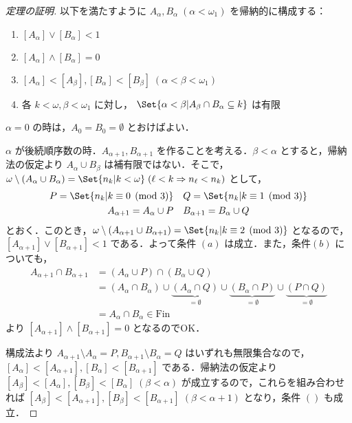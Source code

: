\documentclass[a4j,lualatex,ja=standard]{bxjsarticle}
\begin{document}
\begin{proof}[定理の証明]
 以下を満たすように $A_\alpha, B_\alpha \; (\alpha < \omega_1)$ を帰納的に構成する：
 \begin{enumerate}[label=(\alph*)]
  \item $[A_\alpha] \vee [B_\alpha] < 1$
  \item $[A_\alpha] \wedge [B_\alpha] = 0$
  \item $[A_\alpha] < [A_\beta], [B_\alpha] < [B_\beta]\;(\alpha < \beta < \omega_1)$
  \item 各 $k < \omega, \beta < \omega_1$ に対し，
	$\Set{\alpha < \beta | A_\beta \cap B_\alpha \subseteq k}$ は有限
 \end{enumerate}

 $\alpha = 0$ の時は，$A_0 = B_0 = \emptyset$ とおけばよい．

 $\alpha$ が後続順序数の時．$A_{\alpha + 1}, B_{\alpha + 1}$ を作ることを考える．$\beta < \alpha$ とすると，帰納法の仮定より $A_\alpha \cup B_\beta$ は補有限ではない．そこで，$\omega \setminus (A_\alpha \cup B_\alpha) = \Set{ n_k | k < \omega } \; (\ell < k \Rightarrow n_\ell < n_k)$ として，
 \begin{gather*}
  P = \Set{n_k | k \equiv 0 \pmod{3}} \quad Q = \Set{n_k | k \equiv 1 \pmod{3}}\\
  A_{\alpha + 1} = A_\alpha \cup P \quad B_{\alpha + 1} = B_\alpha \cup Q
 \end{gather*}
  とおく．このとき，$\omega \setminus (A_{\alpha + 1} \cup B_{\alpha + 1}) = \Set{n_k | k \equiv 2 \pmod{3}}$ となるので，$[A_{\alpha + 1}] \vee [B_{\alpha+1}] < 1$ である．よって条件 $(a)$ は成立．また，条件$(b)$ についても，
 \begin{align*}
  A_{\alpha + 1} \cap B_{\alpha+1} &= (A_\alpha \cup P) \cap (B_\alpha \cup Q)\\
  &= (A_\alpha \cap B_\alpha) \cup \underbrace{ (A_\alpha \cap Q)}_{=\emptyset} \cup \underbrace{(B_\alpha \cap P)}_{=\emptyset} \cup \underbrace{(P \cap Q)}_{=\emptyset}\\
  &= A_\alpha \cap B_\alpha \in \mathrm{Fin}
 \end{align*}
 より $[A_{\alpha+1}] \wedge [B_{\alpha+1}] = 0$ となるのでOK．

 構成法より $A_{\alpha+1} \setminus A_{\alpha} = P,  B_{\alpha+1} \setminus B_\alpha = Q$ はいずれも無限集合なので，$[A_\alpha] < [A_{\alpha+1}], [B_\alpha] < [B_{\alpha+1}]$ である．帰納法の仮定より $[A_\beta] < [A_\alpha], [B_\beta] < [B_\alpha] \; (\beta < \alpha)$ が成立するので，これらを組み合わせれば $[A_\beta] < [A_{\alpha+1}], [B_\beta] < [B_{\alpha+1}] \; (\beta < \alpha+1)$ となり，条件 $()$ も成立．


\end{proof}
\end{document}
